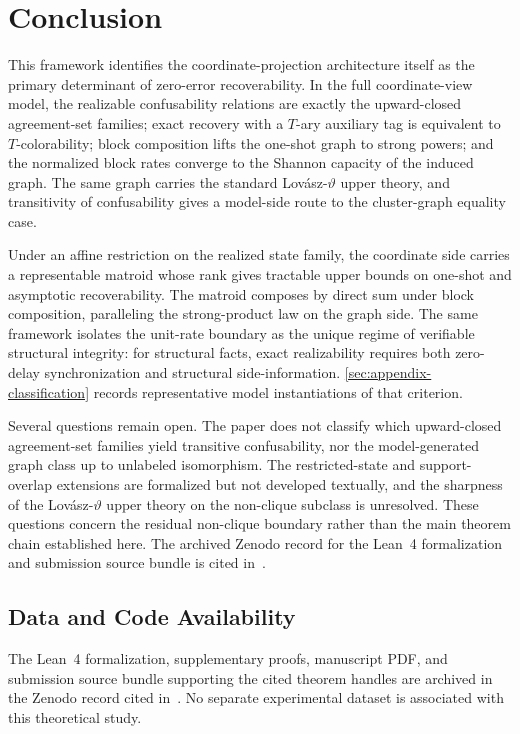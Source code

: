 \section{Conclusion}\label{sec:conclusion}

This framework identifies the coordinate-projection architecture itself as the primary determinant of zero-error recoverability. In the full coordinate-view model, the realizable confusability relations are exactly the upward-closed agreement-set families; exact recovery with a $T$-ary auxiliary tag is equivalent to $T$-colorability; block composition lifts the one-shot graph to strong powers; and the normalized block rates converge to the Shannon capacity of the induced graph. The same graph carries the standard Lov\'asz-$\vartheta$ upper theory, and transitivity of confusability gives a model-side route to the cluster-graph equality case.

Under an affine restriction on the realized state family, the coordinate side carries a representable matroid whose rank gives tractable upper bounds on one-shot and asymptotic recoverability. The matroid composes by direct sum under block composition, paralleling the strong-product law on the graph side. The same framework isolates the unit-rate boundary as the unique regime of verifiable structural integrity: for structural facts, exact realizability requires both zero-delay synchronization and structural side-information. \ref{sec:appendix-classification} records representative model instantiations of that criterion.

Several questions remain open. The paper does not classify which upward-closed agreement-set families yield transitive confusability, nor the model-generated graph class up to unlabeled isomorphism. The restricted-state and support-overlap extensions are formalized but not developed textually, and the sharpness of the Lovász-$\vartheta$ upper theory on the non-clique subclass is unresolved. These questions concern the residual non-clique boundary rather than the main theorem chain established here. The archived Zenodo record for the Lean~4 formalization and submission source bundle is cited in~\cite{paper2_partial_views_artifact}.

\subsection*{Data and Code Availability}

The Lean~4 formalization, supplementary proofs, manuscript PDF, and submission source bundle supporting the cited theorem handles are archived in the Zenodo record cited in~\cite{paper2_partial_views_artifact}. No separate experimental dataset is associated with this theoretical study.
